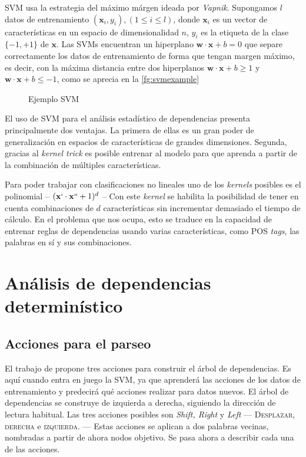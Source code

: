 \ac{SVM} usa la estrategia del máximo márgen ideada por
\emph{Vapnik}. Supongamos $l$ datos de entrenamiento
$(\mathbf{x}_i,y_i), (1 \leq i \leq l)$, donde $\mathbf{x}_i$ es un vector de
características en un espacio de dimensionalidad $n$, $y_i$ es la etiqueta de la
clase $\{-1, +1\}$ de $\mathbf{x}$. Las \acp{SVM} encuentran un hiperplano
$\mathbf{w}\cdot \mathbf{x} + b = 0$ que separe correctamente los datos de
entrenamiento de forma que tengan margen máximo, es decir, con la máxima
distancia entre dos hiperplanos $\mathbf{w}\cdot \mathbf{x} + b \geq 1$ y
$\mathbf{w}\cdot \mathbf{x} + b \leq -1$, como se aprecia en la
\autoref{fg:svmexample}

\begin{figure}[ht]
  \centering
  \caption{Ejemplo \ac{SVM}}
  \label{fg:svmexample}
\end{figure}

El uso de \ac{SVM} para el análisis estadístico de dependencias presenta
principalmente dos ventajas. La primera de ellas es un gran poder de
generalización en espacios de características de grandes dimensiones. Segunda,
gracias al \emph{kernel trick} es posible entrenar al modelo para que aprenda a
partir de la combinación de múltiples características.

Para poder trabajar con clasificaciones no lineales uno de los \emph{kernels}
posibles es el polinomial -- $(\mathbf{x}` \cdot \mathbf{x}`` + 1)^d$ -- Con
este \emph{kernel} se habilita la posibilidad de tener en cuenta combinaciones
de $d$ características sin incrementar demasiado el tiempo de cálculo. En el
problema que nos ocupa, esto se traduce en la capacidad de entrenar reglas de
dependencias usando varias características, como \ac{POS} \emph{tags}, las
palabras en sí y sus combinaciones.

\section{Análisis de dependencias determinístico}
\label{sec:depanalysis}

\subsection{Acciones para el parseo}
\label{subsec:parseractions}

El trabajo de \citeauthor{yamada2003} propone tres acciones para construir el
árbol de dependencias. Es aquí cuando entra en juego la \ac{SVM}, ya que
aprenderá las acciones de los datos de entrenamiento y predecirá qué acciones
realizar para datos nuevos. El árbol de dependencias se construye de izquierda a
derecha, siguiendo la dirección de lectura habitual. Las tres acciones
posibles son \emph{Shift, Right} y \emph{Left} --- \textsc{Desplazar, derecha} e
\textsc{izquierda}. --- Estas acciones se aplican a dos palabras vecinas, nombradas a
partir de ahora nodos objetivo. Se pasa ahora a describir cada una de las
acciones.

